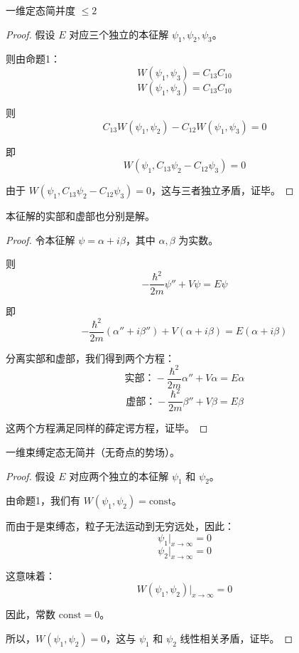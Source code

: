\documentclass[lang=cn,10pt]{elegantbook}
\begin{document}
\begin{proposition}
	一维定态简并度 $\leq 2$
\end{proposition}

\begin{proof}
	假设 $E$ 对应三个独立的本征解 $\psi_1, \psi_2, \psi_3$。
	
	则由命题1：
	\[
	W(\psi_1, \psi_3) = C_{13} C_{10}
	\]
	\[
	W(\psi_1, \psi_3) = C_{13} C_{10}
	\]
	
	则
	\[
	C_{13} W(\psi_1, \psi_2) - C_{12} W(\psi_1, \psi_3) = 0
	\]
	
	即
	\[
	W(\psi_1, C_{13} \psi_2 - C_{12} \psi_3) = 0
	\]
	
	由于 $W(\psi_1, C_{13} \psi_2 - C_{12} \psi_3) = 0$，这与三者独立矛盾，证毕。
\end{proof} 

\begin{proposition}
	本征解的实部和虚部也分别是解。
\end{proposition}

\begin{proof}
	令本征解 $\psi = \alpha + i\beta$，其中 $\alpha, \beta$ 为实数。
	
	则
	\[
	-\frac{\hbar^2}{2m} \psi'' + V \psi = E \psi
	\]
	
	即
	\[
	-\frac{\hbar^2}{2m} (\alpha'' + i\beta'') + V(\alpha + i\beta) = E(\alpha + i\beta)
	\]
	
	分离实部和虚部，我们得到两个方程：
	\[
	\text{实部：} -\frac{\hbar^2}{2m} \alpha'' + V \alpha = E \alpha
	\]
	\[
	\text{虚部：} -\frac{\hbar^2}{2m} \beta'' + V \beta = E \beta
	\]
	
	这两个方程满足同样的薛定谔方程，证毕。
\end{proof}
\begin{proposition}
	一维束缚定态无简并（无奇点的势场）。
\end{proposition}

\begin{proof}
	假设 $E$ 对应两个独立的本征解 $\psi_1$ 和 $\psi_2$。
	
	由命题1，我们有 $W(\psi_1, \psi_2) = \text{const}$。
	
	而由于是束缚态，粒子无法运动到无穷远处，因此：
	\[
	\psi_1 \bigg|_{x \to \infty} = 0
	\]
	\[
	\psi_2 \bigg|_{x \to \infty} = 0
	\]
	
	这意味着：
	\[
	W(\psi_1, \psi_2) \bigg|_{x \to \infty} = 0
	\]
	
	因此，常数 $\text{const} = 0$。
	
	所以，$W(\psi_1, \psi_2) = 0$，这与 $\psi_1$ 和 $\psi_2$ 线性相关矛盾，证毕。
\end{proof}
\end{document}
